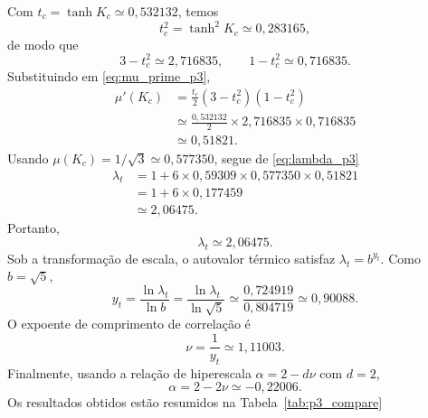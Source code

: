 \documentclass[12pt,a4paper]{article}
\begin{document}
%
Com \(t_c=\tanh K_c\simeq 0{,}532132\), temos
%
\begin{equation}
    t_c^2
    =
    \tanh^2 K_c
    \simeq
    0{,}283165,
\end{equation}
%
de modo que
%
\begin{equation}
    3-t_c^2
    \simeq
    2{,}716835,
    \qquad
    1-t_c^2
    \simeq
    0{,}716835.
\end{equation}
%
Substituindo em \eqref{eq:mu_prime_p3},
%
\begin{align}
    \mu'(K_c)
    &=
    \frac{t_c}{2}
    (3-t_c^2)(1-t_c^2)
    \nonumber\\[4pt]
    &\simeq
    \frac{0{,}532132}{2}
    \times
    2{,}716835
    \times
    0{,}716835
    \nonumber\\[4pt]
    &\simeq
    0{,}51821.
    \label{eq:muprime_c_p3}
\end{align}
%
Usando \(\mu(K_c)=1/\sqrt3\simeq 0{,}577350\), segue de
\eqref{eq:lambda_p3}
%
\begin{align}
    \lambda_t
    &=
    1
    +
    6
    \times
    0{,}59309
    \times
    0{,}577350
    \times
    0{,}51821
    \nonumber\\[4pt]
    &=
    1
    +
    6
    \times
    0{,}177459
    \nonumber\\[4pt]
    &\simeq
    2{,}06475.
    \label{eq:lambda_val_p3}
\end{align}
%
Portanto,
%
\begin{equation}
    \boxed{
    \lambda_t\simeq 2{,}06475.
    }
    \label{eq:lambda_box_p3}
\end{equation}
%
Sob a transformação de escala, o autovalor térmico satisfaz
\(\lambda_t=b^{y_t}\). Como \(b=\sqrt5\),
%
\begin{equation}
    y_t
    =
    \frac{\ln\lambda_t}{\ln b}
    =
    \frac{\ln\lambda_t}{\ln\sqrt5}
    \simeq
    \frac{0{,}724919}{0{,}804719}
    \simeq
    0{,}90088.
    \label{eq:yt_p3}
\end{equation}
%
O expoente de comprimento de correlação é
%
\begin{equation}
    \boxed{
    \nu
    =
    \frac{1}{y_t}
    \simeq
    1{,}11003.
    }
    \label{eq:nu_p3}
\end{equation}
%
Finalmente, usando a relação de hiperescala \(\alpha=2-d\nu\) com
\(d=2\),
%
\begin{equation}
    \boxed{
    \alpha
    =
    2-2\nu
    \simeq
    -0{,}22006.
    }
    \label{eq:alpha_p3}
\end{equation}
%
Os resultados obtidos estão resumidos na Tabela~\ref{tab:p3_compare}
\end{document}
